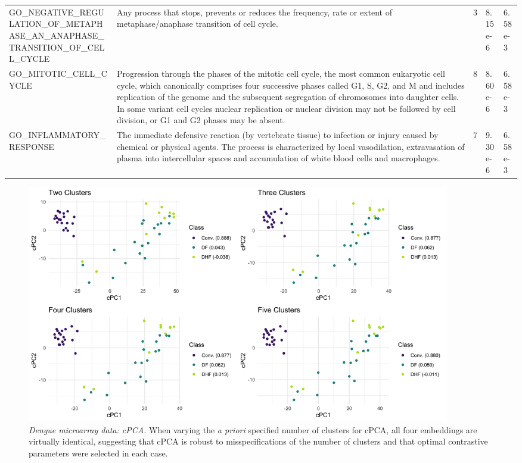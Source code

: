 \documentclass{article}
\begin{document}
\begin{table}
\begin{tabular}{|p{5cm} | p{6cm} | p{1.5cm} | p{1.5cm} | p{1.5cm}|}
  GO\_NEGATIVE\_REGULATION\_OF\_METAPHASE\_AN\newline\_ANAPHASE\_TRANSITION\newline\_OF\_CELL\_CYCLE & Any process that stops, prevents or reduces the frequency, rate or extent of metaphase/anaphase transition of cell cycle. & 3 & 8.15 e-6 & 6.58 e-3 \\
  GO\_MITOTIC\_CELL\_CYCLE & Progression through the phases of the mitotic cell cycle, the most common eukaryotic cell cycle, which canonically comprises four successive phases called G1, S, G2, and M and includes replication of the genome and the subsequent segregation of chromosomes into daughter cells. In some variant cell cycles nuclear replication or nuclear division may not be followed by cell division, or G1 and G2 phases may be absent. & 8 & 8.60 e-6 & 6.58 e-3 \\
  GO\_INFLAMMATORY\_RESPONSE & The immediate defensive reaction (by vertebrate tissue) to infection or injury caused by chemical or physical agents. The process is characterized by local vasodilation, extravasation of plasma into intercellular spaces and accumulation of white blood cells and macrophages. & 7 & 9.30 e-6 & 6.58 e-3 \\
 \hline
\end{tabular}
\label{tab:gsea_dengue}
\end{table}


\begin{figure}[!htbp]
    \centering
    \includegraphics[width=0.9\textwidth]{figures/dengue_cpca_centers}
    \caption{
    {\em Dengue microarray data: cPCA.}
    When varying the \textit{a priori} specified number of clusters for cPCA, all four embeddings are virtually identical, suggesting that cPCA is robust to misspecifications of the number of clusters and that optimal contrastive parameters were selected in each case.}
    \label{fig:dengue_cpca_centers}
\end{figure}
\end{document}
